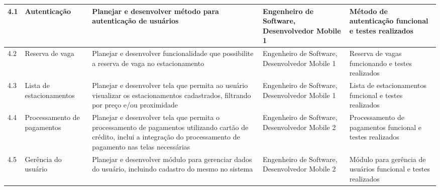 \begin{landscape}
\begin{longtable}{@{\extracolsep{\fill}}  l  p{}  p{}  p{}  p{}  }
		\midrule
		4.1                    & Autenticação                                           & Planejar e desenvolver método para autenticação de usuários                                                                                                                  & Engenheiro de Software, Desenvolvedor Mobile 1                                                   & Método de autenticação funcional e testes realizados                                                  \\*
		\midrule
		4.2                    & Reserva de vaga                                          & Planejar e desenvolver funcionalidade que possibilite a reserva de vaga no estacionamento                                                                                        & Engenheiro de Software, Desenvolvedor Mobile 1                                                   & Reserva de vagas funcionando e testes realizados                                                         \\*
		\midrule
		4.3                    & Lista de estacionamentos                                 & Planejar e desenvolver tela que permita ao usuário visualizar os estacionamentos cadastrados, filtrando por preço e/ou proximidade                                             & Engenheiro de Software, Desenvolvedor Mobile 1                                                   & Lista de estacionamentos funcional e testes realizados                                                   \\*
		\midrule
		4.4                    & Processamento de pagamentos                              & Planejar e desenvolver tela que permita o processamento de pagamentos utilizando cartão de crédito, inclui a integração do processamento de pagamento nas telas necessárias & Engenheiro de Software, Desenvolvedor Mobile 2                                                   & Processamento de pagamentos funcional e testes realizados                                                \\*
		\midrule
		4.5                    & Gerência do usuário                                    & Planejar e desenvolver módulo para gerenciar dados do usuário, incluindo cadastro do mesmo no sistema                                                                          & Engenheiro de Software, Desenvolvedor Mobile 2                                                   & Módulo para gerência de usuários funcional e testes realizados                                        \\*
		\midrule

\end{longtable}
\end{landscape}
